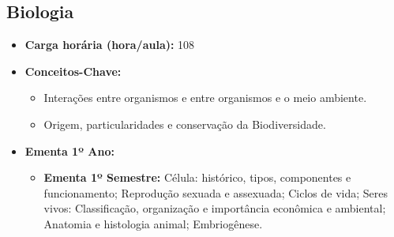 \documentclass[11pt,fleqn]{book} %
\begin{document}
\subsection{Biologia}\label{disc:biologia}
\begin{itemize}
	\item \textbf{Carga horária (hora/aula):} 108
	\item \textbf{Conceitos-Chave:}
	\begin{itemize}
		\item Interações entre organismos e entre organismos e o meio ambiente.
		\item Origem, particularidades e conservação da Biodiversidade.
	\end{itemize}
	\item \textbf{Ementa 1º Ano:}
	\begin{itemize}
		\item \textbf{Ementa 1º Semestre:} 
		Célula: histórico, tipos, componentes e funcionamento; 
		Reprodução sexuada e assexuada; 
		Ciclos de vida; 
		Seres vivos: Classificação, organização e importância econômica e ambiental; 
		Anatomia e histologia animal;
		Embriogênese.
		

\end{itemize}
\end{itemize}
\end{document}
